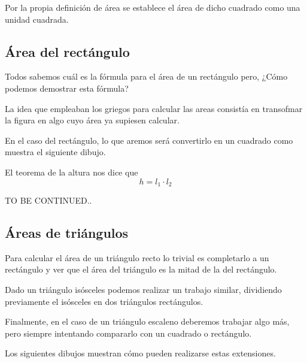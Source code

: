 \documentclass{apuntes}
\begin{document}
Por la propia definición de área se establece el área de dicho cuadrado como una unidad cuadrada.

\subsection{Área del rectángulo}

Todos sabemos cuál es la fórmula para el área de un rectángulo pero, ¿Cómo podemos demostrar esta fórmula?

La idea que empleaban los griegos para calcular las areas consistía en transofmar la figura en algo cuyo área ya supiesen calcular.

En el caso del rectángulo, lo que aremos será convertirlo en un cuadrado como muestra el siguiente dibujo.

\begin{minipage}{0.4\textwidth}
\begin{center}
\end{center}
\end{minipage}
\begin{minipage}{0.55\textwidth}
El teorema de la altura nos dice que
\[h=l_1\cdot l_2\]

TO BE CONTINUED..
\end{minipage}

\subsection{Áreas de triángulos}

Para calcular el área de un triángulo recto lo trivial es completarlo a un rectángulo y ver que el área del triángulo es la mitad de la del rectángulo.

Dado un triángulo isósceles podemos realizar un trabajo similar, dividiendo previamente el isósceles en dos triángulos rectángulos.

Finalmente, en el caso de un triángulo escaleno deberemos trabajar algo más, pero siempre intentando compararlo con un cuadrado o rectángulo.

Los siguientes dibujos muestran cómo pueden realizarse estas extensiones.

\begin{minipage}{0.33\textwidth}
\begin{center}
\end{center}
\end{minipage}
\begin{minipage}{0.33\textwidth}
\begin{center}
\end{center}
\end{minipage}
\begin{minipage}{0.33\textwidth}
\begin{center}
\end{center}
\end{minipage}
\end{document}
